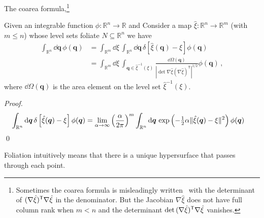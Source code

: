 The coarea formula,\footnote{Sometimes the coarea formula is misleadingly written~\cite{hartmann2007,hartmann2007a} with the determinant of $(\nabla\hat{\xi})^\mathsf{T}\nabla\hat{\xi}$ in the denominator.  But the Jacobian $\nabla\hat{\xi}$ does not have full column rank when $m < n$ and the determinant $\det\,(\nabla\hat{\xi})^\mathsf{T}\nabla\hat{\xi}$ vanishes.}
%
\begin{theorem}
  Given an integrable function $\phi: \mathbb{R}^n \to \mathbb{R}$ and
  Consider a map $\hat{\xi}: \mathbb{R}^n \to \mathbb{R}^m$ (with $m \leq n$) whose level sets foliate $N \subseteq \mathbb{R}^{n}$ we have
  \begin{equation}
    \begin{aligned}
      \int_{\mathbb{R}^n} \dd{\bm{q}}\, \phi(\bm{q}) &= \int_{\mathbb{R}^m} \dd{\xi}\,\int_{\mathbb{R}^n} \dd{\bm{q}}\, \delta\left[\hat{\xi}(\bm{q}) - \xi\right] \phi(\bm{q})\\
                                                     &= \int_{\mathbb{R}^m} \dd{\xi}\,\int_{\bm{q} \in \hat{\xi}^{-1}(\xi)} \frac{\dd{\Omega(\bm{q})}}{|\det \nabla\hat{\xi}(\nabla\hat{\xi})^\mathsf{T}|^{1/2}} \phi(\bm{q})\,,
    \end{aligned}
  \end{equation}
  where $\dd\Omega(\bm{q})$ is the area element on the level set $\hat{\xi}^{-1}(\xi)$.
\end{theorem}
\begin{proof}
  \begin{equation}
    \begin{aligned}
      \int_{\mathbb{R}^{n}} \mathrm{d}\bm{q}\,\delta\left[\hat{\xi}(\bm{q}) - \xi\right] \phi(\bm{q}) &=
      \lim_{\alpha \to \infty} \left(\frac{\alpha}{2\pi}\right)^{m} \int_{\mathbb{R}^{n}} \mathrm{d}\bm{q}\, \exp\left(-\tfrac{1}{2}\alpha\lVert\hat{\xi}(\bm{q}) - \xi\rVert^{2}\right) \phi(\bm{q})
    \end{aligned}
  \end{equation}
  \qed
\end{proof}

Foliation intuitively means that there is a unique hypersurface that passes through each point.

